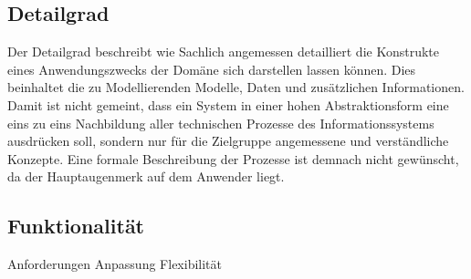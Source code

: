 \subsection{Detailgrad}
\label{ssc:Detailgrad}
Der Detailgrad beschreibt wie Sachlich angemessen detailliert die Konstrukte eines Anwendungszwecks der Domäne sich darstellen lassen können. Dies beinhaltet die zu Modellierenden Modelle, Daten und zusätzlichen Informationen. Damit ist nicht gemeint, dass ein System in einer hohen Abstraktionsform eine eins zu eins Nachbildung 
aller technischen Prozesse des Informationssystems ausdrücken soll, sondern nur für die Zielgruppe angemessene und verständliche Konzepte. Eine formale Beschreibung der Prozesse ist demnach nicht gewünscht, da der Hauptaugenmerk auf dem Anwender liegt.

\subsection{Funktionalität}
\label{ssc:Funktionalität}
Anforderungen
Anpassung
Flexibilität

